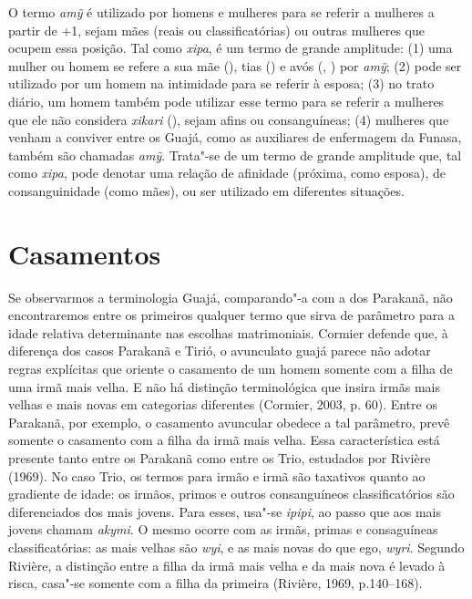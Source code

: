 O termo \emph{amỹ} é utilizado por homens e mulheres para se referir a
mulheres a partir de +1, sejam mães (reais ou classificatórias) ou
outras mulheres que ocupem essa posição. Tal como \emph{xipa}, é um
termo de grande amplitude: (1) uma mulher ou homem se refere a sua mãe
(), tias () e avós (, ) por \emph{amỹ}; (2) pode ser utilizado
por um homem na intimidade para se referir à esposa; (3) no trato
diário, um homem também pode utilizar esse termo para se referir a
mulheres que ele não considera \emph{xikari} (), sejam afins ou
consanguíneas; (4) mulheres que venham a conviver entre os Guajá, como
as auxiliares de enfermagem da Funasa, também são chamadas \emph{amỹ}.
Trata"-se de um termo de grande amplitude que, tal como \emph{xipa}, pode
denotar uma relação de afinidade (próxima, como esposa), de
consanguinidade (como mães), ou ser utilizado em diferentes situações.

\section{Casamentos}\label{casamentos}

Se observarmos a terminologia Guajá, comparando"-a com a dos Parakanã,
não encontraremos entre os primeiros qualquer termo que sirva de
parâmetro para a idade relativa determinante nas escolhas matrimoniais.
Cormier defende que, à diferença dos casos Parakanã e Tirió, o
avunculato guajá parece não adotar regras explícitas que oriente o
casamento de um homem somente com a filha de uma irmã mais velha. E não
há distinção terminológica que insira irmãs mais velhas e mais novas em
categorias diferentes (Cormier, 2003, p. 60). Entre os Parakanã, por
exemplo, o casamento avuncular obedece a tal parâmetro, prevê somente o
casamento com a filha da irmã mais velha. Essa característica está
presente tanto entre os Parakanã como entre os Trio, estudados por
Rivière (1969). No caso Trio, os termos para irmão e irmã são taxativos
quanto ao gradiente de idade: os irmãos, primos e outros consanguíneos
classificatórios são diferenciados dos mais jovens. Para esses, usa"-se
\emph{ipipi}, ao passo que aos mais jovens chamam \emph{akymi}. O mesmo
ocorre com as irmãs, primas e consaguíneas classificatórias: as mais
velhas são \emph{wyi}, e as mais novas do que ego, \emph{wyri}. Segundo
Rivière, a distinção entre a filha da irmã mais velha e da mais nova é
levado à risca, casa"-se somente com a filha da primeira (Rivière, 1969,
p.140--168).

